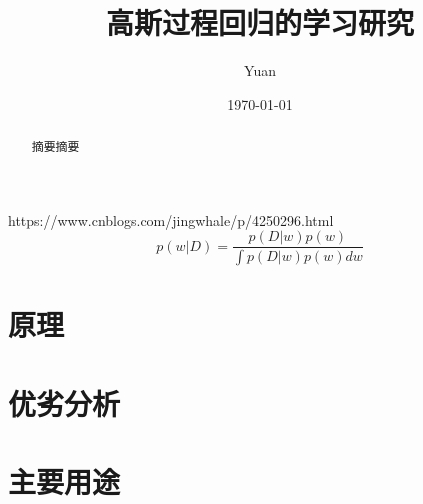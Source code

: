 \documentclass[12pt,a4paper,draft]{ctexart}
\title{高斯过程回归的学习研究}
\author{Yuan}
\date{\today}
\begin{document}
\maketitle
\begin{abstract}
摘要摘要
\end{abstract}	
https://www.cnblogs.com/jingwhale/p/4250296.html
\[ p(w|D)=\frac{p(D|w)p(w)}{\int p(D|w)p(w)dw} \]
\section{原理}
\section{优劣分析}
\section{主要用途}
\end{document}
